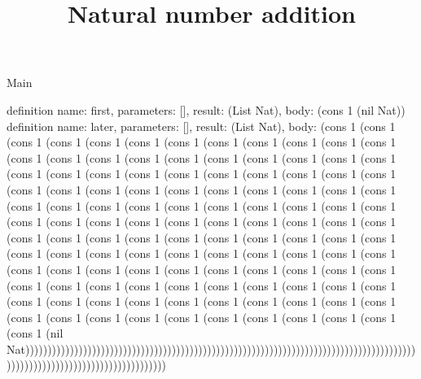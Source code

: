 \begin{lexlean}{Main}
\title{Natural number addition}
\begin{semanticmodule}
definition{ name: first, parameters: [], result: (List Nat), body: (cons 1 (nil Nat)) }
definition{ name: later, parameters: [], result: (List Nat), body: (cons 1 (cons 1 (cons 1 (cons 1 (cons 1 (cons 1 (cons 1 (cons 1 (cons 1 (cons 1 (cons 1 (cons 1 (cons 1 (cons 1 (cons 1 (cons 1 (cons 1 (cons 1 (cons 1 (cons 1 (cons 1 (cons 1 (cons 1 (cons 1 (cons 1 (cons 1 (cons 1 (cons 1 (cons 1 (cons 1 (cons 1 (cons 1 (cons 1 (cons 1 (cons 1 (cons 1 (cons 1 (cons 1 (cons 1 (cons 1 (cons 1 (cons 1 (cons 1 (cons 1 (cons 1 (cons 1 (cons 1 (cons 1 (cons 1 (cons 1 (cons 1 (cons 1 (cons 1 (cons 1 (cons 1 (cons 1 (cons 1 (cons 1 (cons 1 (cons 1 (cons 1 (cons 1 (cons 1 (cons 1 (cons 1 (cons 1 (cons 1 (cons 1 (cons 1 (cons 1 (cons 1 (cons 1 (cons 1 (cons 1 (cons 1 (cons 1 (cons 1 (cons 1 (cons 1 (cons 1 (cons 1 (cons 1 (cons 1 (cons 1 (cons 1 (cons 1 (cons 1 (cons 1 (cons 1 (cons 1 (cons 1 (cons 1 (cons 1 (cons 1 (cons 1 (cons 1 (cons 1 (cons 1 (cons 1 (cons 1 (cons 1 (cons 1 (cons 1 (cons 1 (cons 1 (cons 1 (cons 1 (cons 1 (cons 1 (cons 1 (cons 1 (cons 1 (cons 1 (cons 1 (cons 1 (cons 1 (cons 1 (cons 1 (cons 1 (cons 1 (cons 1 (cons 1 (cons 1 (nil Nat)))))))))))))))))))))))))))))))))))))))))))))))))))))))))))))))))))))))))))))))))))))))))))))))))))))))))))))))))))))))))))) }
\end{semanticmodule}
\end{lexlean}
